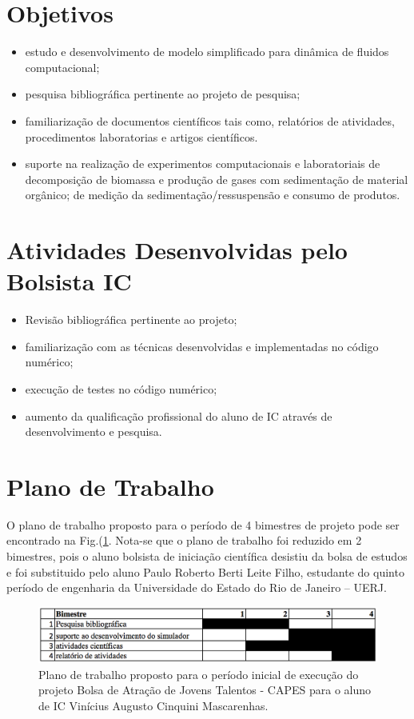 \documentclass[a4paper,portuges,12pt]{article}
\begin{document}
\section{Objetivos}
\begin{itemize}
	\item estudo e desenvolvimento de modelo simplificado para dinâmica
	      de fluidos computacional;
    \item pesquisa bibliográfica pertinente ao projeto de pesquisa;
	\item familiarização de documentos científicos tais como, relatórios
	      de atividades, procedimentos laboratorias e artigos científicos.
	\item suporte na realização de experimentos computacionais e
		  laboratoriais de decomposição de biomassa e produção de gases
		  com sedimentação de material orgânico; de medição da
		  sedimentação/ressuspensão e consumo de produtos.
\end{itemize}

\section{Atividades Desenvolvidas pelo Bolsista IC}

\begin{itemize}
\item Revisão bibliográfica pertinente ao projeto;
\item familiarização com as técnicas desenvolvidas e implementadas no
código numérico;
\item execução de testes no código numérico;
\item aumento da qualificação profissional do aluno de IC através de
desenvolvimento e pesquisa.
\end{itemize}


\section{Plano de Trabalho}
O plano de trabalho proposto para o período de 4 bimestres de
projeto pode ser encontrado na Fig.(\ref{fig:plano}. Nota-se que o plano de trabalho foi reduzido em
2 bimestres, pois o aluno bolsista de iniciação científica desistiu da
bolsa de estudos e foi substituido pelo aluno Paulo Roberto Berti Leite
Filho, estudante do quinto período de engenharia da Universidade do
Estado do Rio de Janeiro -- UERJ.

 \begin{figure}[ht!]
 	\begin{center}
 		\includegraphics[angle=0, scale=0.9]{figs/ic-plano.png}
 	\end{center}
 	\caption{Plano de trabalho proposto para o período inicial de
	execução do projeto Bolsa de Atração de Jovens Talentos - CAPES para
	o aluno de IC Vinícius Augusto Cinquini Mascarenhas.}
 	\label{fig:plano} 
 \end{figure}
\end{document}
